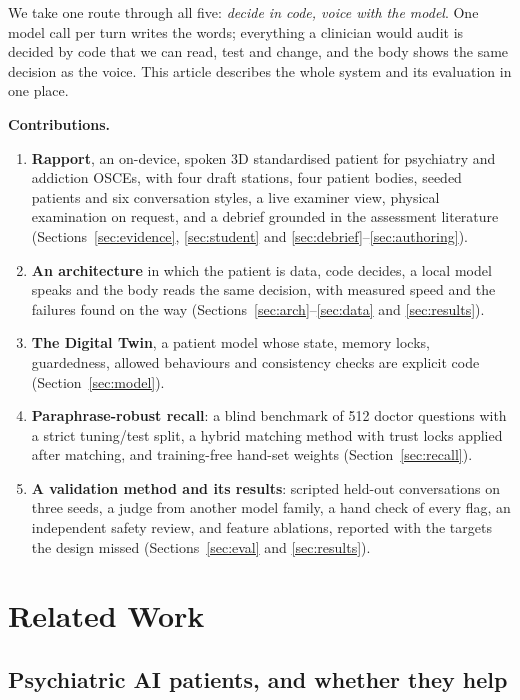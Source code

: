 \documentclass[journal]{IEEEtran}
\begin{document}
We take one route through all five: \emph{decide in code, voice with the model}. One model call per turn writes the words; everything a
clinician would audit is decided by code that we can read, test and change, and the body shows the same decision as the voice. This article
describes the whole system and its evaluation in one place.

\textbf{Contributions.}
\begin{enumerate}
\item \textbf{Rapport}, an on-device, spoken 3D standardised patient for psychiatry and addiction OSCEs, with four draft stations, four patient
bodies, seeded patients and six conversation styles, a live examiner view, physical examination on request, and a debrief grounded in the
assessment literature (Sections~\ref{sec:evidence}, \ref{sec:student} and \ref{sec:debrief}--\ref{sec:authoring}).
\item \textbf{An architecture} in which the patient is data, code decides, a local model speaks and the body reads the same decision, with
measured speed and the failures found on the way (Sections~\ref{sec:arch}--\ref{sec:data} and \ref{sec:results}).
\item \textbf{The Digital Twin}, a patient model whose state, memory locks, guardedness, allowed behaviours and consistency checks are explicit
code (Section~\ref{sec:model}).
\item \textbf{Paraphrase-robust recall}: a blind benchmark of 512 doctor questions with a strict tuning/test split, a hybrid matching method with
trust locks applied after matching, and training-free hand-set weights (Section~\ref{sec:recall}).
\item \textbf{A validation method and its results}: scripted held-out conversations on three seeds, a judge from another model family, a hand
check of every flag, an independent safety review, and feature ablations, reported with the targets the design missed
(Sections~\ref{sec:eval} and \ref{sec:results}).
\end{enumerate}

\section{Related Work}
\subsection{Psychiatric AI patients, and whether they help}
\end{document}
